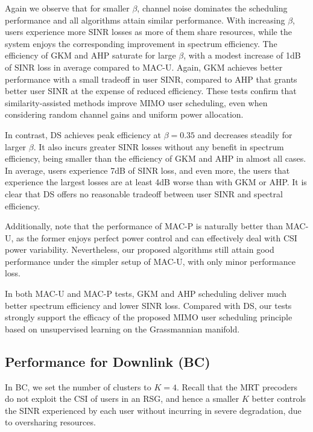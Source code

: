 Again we observe that for smaller $\beta$, channel noise dominates the scheduling performance and all algorithms attain similar performance. With increasing $\beta$, users experience more SINR losses as more of them share resources, while the system enjoys the corresponding improvement in spectrum efficiency. The efficiency of GKM and AHP saturate for large $\beta$, with a modest increase of 1dB of SINR loss in average compared to MAC-U. Again, GKM achieves better performance with a small tradeoff in user SINR, compared to AHP that grants better user SINR at the expense of reduced efficiency. These tests confirm that similarity-assisted methods improve MIMO user scheduling, even when considering random channel gains and uniform power allocation.

In contrast, DS achieves peak efficiency at $\beta=0.35$ and decreases steadily for larger $\beta$. 
It also incurs greater SINR losses without any benefit in spectrum efficiency, being smaller than the efficiency of GKM and AHP in almost all cases. 
In average, users experience 7dB of SINR loss, and even more, the users that experience the largest losses are at least 4dB worse than with GKM or AHP. 
It is clear that DS offers no reasonable tradeoff between user SINR and spectral efficiency.

Additionally, note that the performance of MAC-P is naturally better than MAC-U, as the former enjoys perfect power control and can effectively deal with CSI power variability. Nevertheless, our proposed algorithms still attain good performance under the simpler setup of MAC-U, with only minor performance loss.

In both MAC-U and MAC-P tests, GKM and AHP scheduling deliver much better spectrum efficiency and lower SINR loss.
Compared with DS, our tests strongly support the efficacy of the proposed MIMO user scheduling principle based on unsupervised learning on the Grassmannian manifold. 


\subsection{Performance for Downlink (BC)}
In BC, we set the number of clusters to $K=4$. Recall that the MRT precoders do not exploit the CSI of users in an RSG, and hence a smaller $K$ better controls the SINR experienced by each user without incurring in severe degradation, due to oversharing resources. 
